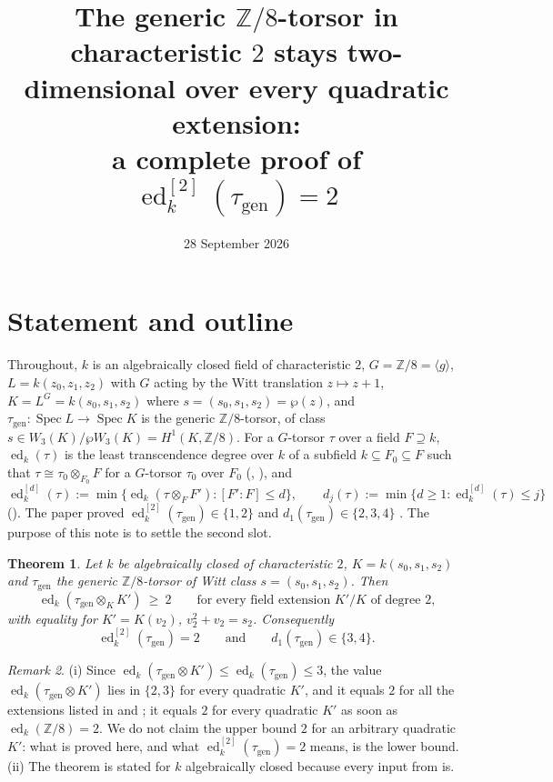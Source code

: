 \documentclass[11pt]{amsart}
\newtheorem{theorem}{Theorem}[section]
\theoremstyle{definition}
\theoremstyle{remark}
\newtheorem{remark}[theorem]{Remark}
\newcommand{\ed}{\operatorname{ed}}
\newcommand{\edd}[1]{\ed^{[#1]}}
\newcommand{\gen}{\mathrm{gen}}
\newcommand{\Z}{\mathbb Z}
\newcommand{\Spec}{\operatorname{Spec}}
\begin{document}
\title[The second slot equals two]{The generic $\Z/8$-torsor in characteristic $2$
stays two-dimensional over every quadratic extension:\\ a complete proof of
$\ed^{[2]}_k(\tau_{\gen})=2$}
\author{}
\date{28 September 2026}
\maketitle

\section{Statement and outline}\label{sec:statement}

Throughout, $k$ is an algebraically closed field of characteristic $2$,
$G=\Z/8=\langle g\rangle$, $L=k(z_0,z_1,z_2)$ with $G$ acting by the Witt translation
$z\mapsto z+1$, $K=L^G=k(s_0,s_1,s_2)$ where $s=(s_0,s_1,s_2)=\wp(z)$, and
$\tau_{\gen}\colon\Spec L\to\Spec K$ is the generic $\Z/8$-torsor, of class
$s\in W_3(K)/\wp W_3(K)=H^1(K,\Z/8)$. For a $G$-torsor $\tau$ over a field $F\supseteq k$,
$\ed_k(\tau)$ is the least transcendence degree over $k$ of a subfield $k\subseteq F_0\subseteq F$
such that $\tau\cong\tau_0\otimes_{F_0}F$ for a $G$-torsor $\tau_0$ over $F_0$
(\cite[\S1]{BF}, \cite[Def.~3.1]{P}), and
\[
\edd d_k(\tau):=\min\{\ed_k(\tau\otimes_FF'):[F':F]\le d\},\qquad
d_j(\tau):=\min\{d\ge1:\edd d_k(\tau)\le j\}
\]
(\cite[Definition 3.1]{P}). The paper \cite{P} proved $\edd2_k(\tau_{\gen})\in\{1,2\}$
and $d_1(\tau_{\gen})\in\{2,3,4\}$ \cite[Theorem 7.1]{P}. The purpose of this note is to
settle the second slot.

\begin{theorem}\label{thm:main}
Let $k$ be algebraically closed of characteristic $2$, $K=k(s_0,s_1,s_2)$ and
$\tau_{\gen}$ the generic $\Z/8$-torsor of Witt class $s=(s_0,s_1,s_2)$. Then
\[
\ed_k(\tau_{\gen}\otimes_KK')\ \ge\ 2\qquad\text{for every field extension $K'/K$ of degree $2$,}
\]
with equality for $K'=K(v_2)$, $v_2^2+v_2=s_2$. Consequently
\[
\edd2_k(\tau_{\gen})=2\qquad\text{and}\qquad d_1(\tau_{\gen})\in\{3,4\}.
\]
\end{theorem}

\begin{remark}\label{rem:statement}
(i) Since $\ed_k(\tau_{\gen}\otimes K')\le\ed_k(\tau_{\gen})\le3$, the value
$\ed_k(\tau_{\gen}\otimes K')$ lies in $\{2,3\}$ for every quadratic $K'$, and it equals
$2$ for all the extensions listed in \cite[Theorem 7.1]{P} and \cite[Theorem 11.9]{A};
it equals $2$ for every quadratic $K'$ as soon as $\ed_k(\Z/8)=2$. We do not claim the
upper bound $2$ for an arbitrary quadratic $K'$: what is proved here, and what
$\edd2_k(\tau_{\gen})=2$ means, is the lower bound.
(ii) The theorem is stated for $k$ algebraically closed because every input from
\cite{P} is.
\end{remark}
\end{document}
